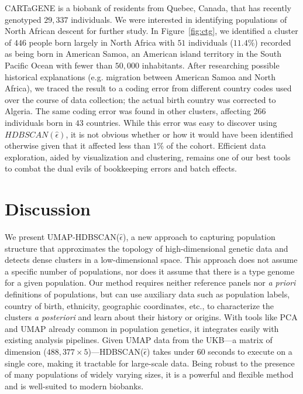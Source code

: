 CARTaGENE is a biobank of residents from Quebec, Canada, that has recently genotyped $29,337$ individuals\citep{awadalla_cohort_2013}. We were interested in identifying populations of North African descent for further study. In Figure~\ref{fig:ctg}, we identified a cluster of $446$ people born largely in North Africa with $51$ individuals ($11.4\%$) recorded as being born in American Samoa, an American island territory in the South Pacific Ocean with fewer than $50,000$ inhabitants. After researching possible historical explanations (e.g. migration between American Samoa and North Africa), we traced the result to a coding error from different country codes used over the course of data collection; the actual birth country was corrected to Algeria. The same coding error was found in other clusters, affecting $266$ individuals born in $43$ countries. While this error was easy to discover using $HDBSCAN(\hat{\epsilon})$, it is not obvious whether or how it would have been identified otherwise given that it affected less than $1\%$ of the cohort. Efficient data exploration, aided by visualization and clustering, remains one of our best tools to combat the dual evils of bookkeeping errors and batch effects.

\section{Discussion}

We present UMAP-HDBSCAN($\hat{\epsilon}$), a new approach to capturing population structure that approximates the topology of high-dimensional genetic data and detects dense clusters in a low-dimensional space. This approach does not assume a specific number of populations, nor does it assume that there is a type genome for a given population. Our method requires neither reference panels nor \emph{a priori} definitions of populations, but can use auxiliary data such as population labels, country of birth, ethnicity, geographic coordinates, etc., to characterize the clusters \emph{a posteriori} and learn about their history or origins. With tools like PCA and UMAP already common in population genetics\citep{diaz-papkovich_review_2021}, it integrates easily with existing analysis pipelines. Given UMAP data from the UKB---a matrix of dimension ($488,377 \times 5$)---HDBSCAN($\hat{\epsilon}$) takes under $60$ seconds to execute on a single core, making it tractable for large-scale data. Being robust to the presence of many populations of widely varying sizes, it is a powerful and flexible method and is well-suited to modern biobanks.

